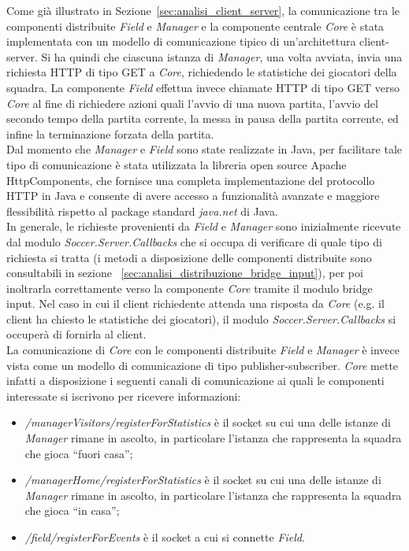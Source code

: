 Come già illustrato in Sezione~\ref{sec:analisi_client_server}, la comunicazione tra le componenti distribuite \emph{Field} e \emph{Manager} e la componente centrale \emph{Core} è stata implementata con un modello di comunicazione tipico di un’architettura client-server. Si ha quindi che ciascuna istanza di \emph{Manager}, una volta avviata, invia una richiesta HTTP di tipo GET a \emph{Core}, richiedendo le statistiche dei giocatori della squadra. La componente \emph{Field} effettua invece chiamate HTTP di tipo GET verso \emph{Core} al fine di richiedere azioni quali l'avvio di una nuova partita, l'avvio del secondo tempo della partita corrente, la messa in pausa della partita corrente, ed infine la terminazione forzata della partita.\\

Dal momento che \textit{Manager} e \textit{Field} sono state realizzate in Java, per facilitare tale tipo di comunicazione è stata utilizzata la libreria open source Apache HttpComponents, che fornisce una completa implementazione del protocollo HTTP in Java e consente di avere accesso a funzionalità avanzate e maggiore flessibilità rispetto al package standard \emph{java.net} di Java.\\

In generale, le richieste provenienti da \emph{Field} e \emph{Manager} sono inizialmente ricevute dal modulo \emph{Soccer.Server.Callbacks} che si occupa di verificare di quale tipo di richiesta si tratta (i metodi a disposizione delle componenti distribuite sono consultabili in sezione ~\ref{sec:analisi_distribuzione_bridge_input}), per poi inoltrarla correttamente verso la componente \emph{Core} tramite il modulo bridge input. Nel caso in cui il client richiedente attenda una risposta da \emph{Core} (e.g. il client ha chiesto le statistiche dei giocatori), il modulo \emph{Soccer.Server.Callbacks} si occuper\`{a} di fornirla al client.\\

La comunicazione di \emph{Core} con le componenti distribuite \emph{Field} e \emph{Manager} è invece vista come un modello di comunicazione di tipo publisher-subscriber. \emph{Core} mette infatti a disposizione i seguenti canali di comunicazione ai quali le componenti interessate si iscrivono per ricevere informazioni:

\begin{itemize}
	\item \emph{/managerVisitors/registerForStatistics} \`{e} il socket su cui una delle istanze di \emph{Manager} rimane in ascolto, in particolare l'istanza che rappresenta la squadra che gioca ``fuori casa'';
	\item \emph{/managerHome/registerForStatistics} \`{e} il socket su cui una delle istanze di \emph{Manager} rimane in ascolto, in particolare l'istanza che rappresenta la squadra che gioca ``in casa'';
	\item \emph{/field/registerForEvents} \`{e} il socket a cui si connette \emph{Field}.
\end{itemize}

